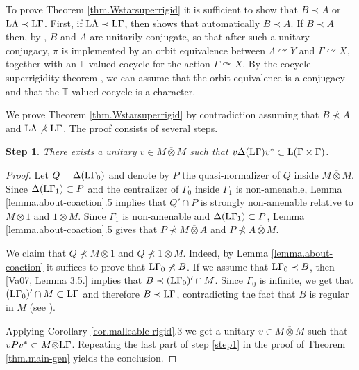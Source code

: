 \documentclass[a4paper,11pt]{amsart}
\numberwithin{equation}{section}
\newtheorem{step}{Step}[section]
\begin{document}
To prove Theorem \ref{thm.Wstarsuperrigid} it is sufficient to show
that  $B\prec A$ or ${\mathord{\text{\rm L}}}\Lambda\prec {\mathord{\text{\rm L}}}\Gamma$. First, if ${\mathord{\text{\rm L}}}
\Lambda \prec {\mathord{\text{\rm L}}} \Gamma$, then \cite[Case (5) in the proof of
Theorem 9.1]{Io10} shows that automatically $B\prec A$. If $B\prec
A$ then, by \cite[Theorem A.1]{Po01b}, $B$ and $A$ are unitarily
conjugate, so that after such a unitary conjugacy, $\pi$ is
implemented by an orbit equivalence between $\Lambda {\curvearrowright} Y$ and
$\Gamma {\curvearrowright} X$, together with an ${\mathbb{T}}$-valued cocycle for the
action $\Gamma {\curvearrowright} X$. By the cocycle superrigidity theorem
\cite[Theorem 1.1]{Po06a}, we can assume that the orbit equivalence
is a conjugacy and that the ${\mathbb{T}}$-valued cocycle is a character.

We prove Theorem \ref{thm.Wstarsuperrigid} by contradiction assuming that $B\nprec A$ and ${\mathord{\text{\rm L}}}\Lambda\nprec {\mathord{\text{\rm L}}}\Gamma$. The proof consists of several steps.

\begin{step}\label{step1adrian}
There exists a unitary $v\in M\overline{\otimes}M$ such that $v\Delta({\mathord{\text{\rm L}}}\Gamma)v^*\subset {\mathord{\text{\rm L}}}(\Gamma\times\Gamma)$.
\end{step}
\begin{proof}
Let $Q=\Delta({\mathord{\text{\rm L}}}\Gamma_0)$ and denote by $P$ the quasi-normalizer of $Q$ inside $M\overline{\otimes}M$. Since $\Delta({\mathord{\text{\rm L}}}\Gamma_1)\subset P$ and the centralizer of $\Gamma_0$ inside $\Gamma_1$ is non-amenable, Lemma \ref{lemma.about-coaction}.5 implies that $Q'\cap P$ is strongly non-amenable relative to $M\otimes 1$ and $1\otimes M$. Since $\Gamma_1$ is non-amenable and $\Delta({\mathord{\text{\rm L}}}\Gamma_1)\subset P$, Lemma \ref{lemma.about-coaction}.5 gives that $P\nprec M\overline{\otimes}A$ and $P\nprec A\overline{\otimes}M$.

We claim that $Q\nprec M\otimes 1$ and $Q\nprec 1\otimes M$. Indeed, by Lemma \ref{lemma.about-coaction} it suffices to prove that ${\mathord{\text{\rm L}}}\Gamma_0\nprec B$. If  we assume that ${\mathord{\text{\rm L}}}\Gamma_0\prec B$, then [Va07, Lemma 3.5.] implies that $B\prec ({\mathord{\text{\rm L}}}\Gamma_0)'\cap M$. Since $\Gamma_0$ is infinite,  we get that $({\mathord{\text{\rm L}}}\Gamma_0)'\cap M\subset {\mathord{\text{\rm L}}}\Gamma$ and therefore $B\prec {\mathord{\text{\rm L}}}\Gamma$, contradicting the fact that $B$ is regular in $M$ (see \cite[Theorem 3.1]{Po03}).

Applying Corollary \ref{cor.malleable-rigid}.3 we get a unitary $v\in M\overline{\otimes}M$ such that $vPv^*\subset M\overline{\otimes}{\mathord{\text{\rm L}}}\Gamma$. Repeating the last part of step \ref{step1} in the proof of Theorem \ref{thm.main-gen} yields the conclusion.
\end{proof}
\end{document}
